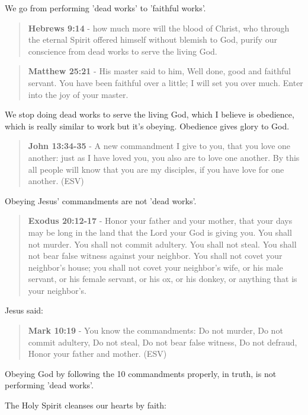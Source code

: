 \documentclass[11pt]{article}
\begin{document}
We go from performing 'dead works' to 'faithful works'.

\begin{quote}
\textbf{Hebrews 9:14} - how much more will the blood of Christ, who through the eternal Spirit offered himself without blemish to God, purify our conscience from dead works to serve the living God.
\end{quote}

\begin{quote}
\textbf{Matthew 25:21} - His master said to him, Well done, good and faithful servant. You have been faithful over a little; I will set you over much. Enter into the joy of your master.
\end{quote}

We stop doing dead works to serve the living God, which I believe is obedience,
which is really similar to work but it's obeying. Obedience gives glory to God.

\begin{quote}
\textbf{John 13:34-35} - A new commandment I give to you, that you love one another: just as I have loved you, you also are to love one another. By this all people will know that you are my disciples, if you have love for one another. (ESV)
\end{quote}

Obeying Jesus' commandments are not 'dead works'.

\begin{quote}
\textbf{Exodus 20:12-17} - Honor your father and your mother, that your days may be long in the land that the Lord your God is giving you. You shall not murder. You shall not commit adultery. You shall not steal. You shall not bear false witness against your neighbor. You shall not covet your neighbor's house; you shall not covet your neighbor's wife, or his male servant, or his female servant, or his ox, or his donkey, or anything that is your neighbor's.
\end{quote}

Jesus said:

\begin{quote}
\textbf{Mark 10:19} - You know the commandments: Do not murder, Do not commit adultery, Do not steal, Do not bear false witness, Do not defraud, Honor your father and mother. (ESV)
\end{quote}

Obeying God by following the 10 commandments properly, in truth, is not performing 'dead works'.

The Holy Spirit cleanses our hearts by faith:
\end{document}
